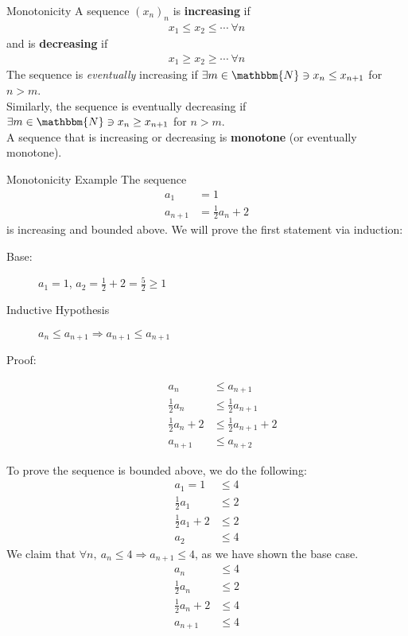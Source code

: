\documentclass[10pt]{extarticle}
\newcommand{\N}{\mathbbm{N}}
\begin{document}
  \begin{problem}{Monotonicity}
    A sequence $(x_n)_n$ is \textbf{increasing} if
    \begin{align*}
      x_1 \leq x_2 \leq \cdots~\forall n
    \end{align*}
    and is \textbf{decreasing} if
    \begin{align*}
      x_1 \geq x_2 \geq \cdots~\forall n
    \end{align*}
    The sequence is \textsl{eventually} increasing if $\exists m\in \N \ni x_n \leq x_{n+1}$ for $n > m$.\\

    Similarly, the sequence is eventually decreasing if $\exists m\in\N \ni x_n \geq x_{n+1}$ for $n > m$.\\

    A sequence that is increasing or decreasing is \textbf{monotone} (or eventually monotone).\\

  \end{problem}
  \begin{problem}{Monotonicity Example}
    The sequence
    \begin{align*}
      a_1 &= 1\\
      a_{n+1} &= \frac{1}{2}a_n + 2
    \end{align*}
    is increasing and bounded above.
    \tcblower
    We will prove the first statement via induction:
    \begin{description}
      \item[Base:] $a_1 = 1$, $a_2 = \frac{1}{2} + 2 = \frac{5}{2} \geq 1$
      \item[Inductive Hypothesis] $a_n \leq a_{n+1} \Rightarrow a_{n+1} \leq a_{n+1}$
      \item[Proof:]
        \begin{align*}
          a_{n} &\leq a_{n+1}\\
          \frac{1}{2}a_n &\leq \frac{1}{2}a_{n+1}\\
          \frac{1}{2}a_n + 2 &\leq \frac{1}{2}a_{n+1} + 2\\
          a_{n+1} &\leq a_{n+2}
        \end{align*}
    \end{description}
    To prove the sequence is bounded above, we do the following:
    \begin{align*}
      a_1 = 1 &\leq 4\\
      \frac{1}{2}a_1 &\leq 2\\
      \frac{1}{2}a_1 + 2 &\leq 2\\
      a_{2} &\leq 4
    \end{align*}
    We claim that $\forall n,~a_n \leq 4 \Rightarrow a_{n+1} \leq 4$, as we have shown the base case.
    \begin{align*}
      a_{n} &\leq 4\\
      \frac{1}{2}a_n &\leq 2\\
      \frac{1}{2}a_n + 2 &\leq 4\\
      a_{n+1} &\leq 4
    \end{align*}
  \end{problem}
\end{document}
